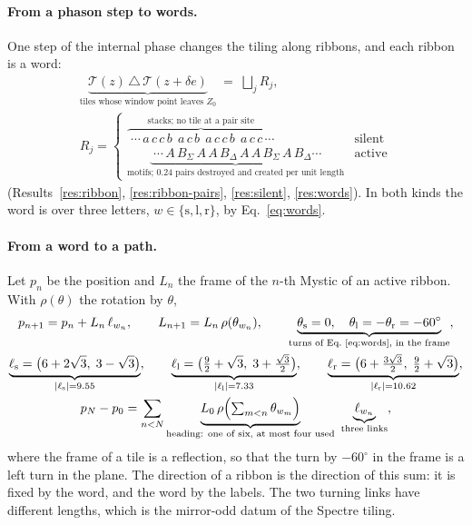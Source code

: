 \documentclass[11pt]{article}
\theoremstyle{definition}
\begin{document}
\paragraph{From a phason step to words.} One step of the internal phase changes the tiling along ribbons, and each ribbon is a word:
\begin{equation}\label{eq:fit-ribbon}
\begin{gathered}
\underbrace{\mathcal{T}(z)\,\triangle\,\mathcal{T}(z+\delta e)}_{\text{tiles whose window point leaves } Z_0}
\;=\;\bigsqcup_j R_j ,\\[4pt]
R_j=\begin{cases}
\overbrace{\;\cdots\,a\,c\,c\,b\;\,a\,c\,b\;\,a\,c\,c\,b\;\,a\,c\,c\,\cdots}^{\text{stacks; no tile at a pair site}} & \text{silent}\\[6pt]
\underbrace{\;\cdots\,A\,B_\Sigma\,A\,A\,B_\Delta\,A\,A\,B_\Sigma\,A\,B_\Delta\cdots}_{\text{motifs; } 0.24 \text{ pairs destroyed and created per unit length}} & \text{active}
\end{cases}
\end{gathered}
\end{equation}
(Results~\ref{res:ribbon}, \ref{res:ribbon-pairs}, \ref{res:silent}, \ref{res:words}). In both kinds the word is over three letters, $w\in\{\mathrm{s},\mathrm{l},\mathrm{r}\}$, by Eq.~\eqref{eq:words}.

\paragraph{From a word to a path.} Let $p_n$ be the position and $L_n$ the frame of the $n$-th Mystic of an active ribbon. With $\rho(\theta)$ the rotation by $\theta$,
\begin{equation}\label{eq:fit-path}
\begin{gathered}
p_{n+1}=p_n+L_n\,\ell_{w_n},\qquad L_{n+1}=L_n\,\rho(\theta_{w_n}),\qquad
\underbrace{\theta_{\mathrm s}=0,\quad \theta_{\mathrm l}=-\theta_{\mathrm r}=-60^\circ}_{\text{turns of Eq.~\eqref{eq:words}, in the frame}},\\
\underbrace{\ell_{\mathrm s}=\bigl(6+2\sqrt3,\;3-\sqrt3\bigr)}_{|\ell_{\mathrm s}|=9.55},\qquad
\underbrace{\ell_{\mathrm l}=\bigl(\tfrac92+\sqrt3,\;3+\tfrac{\sqrt3}2\bigr)}_{|\ell_{\mathrm l}|=7.33},\qquad
\underbrace{\ell_{\mathrm r}=\bigl(6+\tfrac{3\sqrt3}2,\;\tfrac92+\sqrt3\bigr)}_{|\ell_{\mathrm r}|=10.62},\\
p_N-p_0=\sum_{n<N}\underbrace{L_0\,\rho\Bigl(\textstyle\sum_{m<n}\theta_{w_m}\Bigr)}_{\text{heading: one of six, at most four used}}\ \underbrace{\ell_{w_n}}_{\text{three links}} ,
\end{gathered}
\end{equation}
where the frame of a tile is a reflection, so that the turn by $-60^\circ$ in the frame is a left turn in the plane. The direction of a ribbon is the direction of this sum: it is fixed by the word, and the word by the labels. The two turning links have different lengths, which is the mirror-odd datum of the Spectre tiling.
\end{document}
